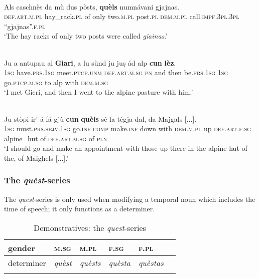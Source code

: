 \ea\label{demtop1}
\\
\gll   Als caschnès da mù dus pòsts, \textbf{quèls} numnávani gjajnas.\\
     \textsc{def.art.m.pl} hay\_rack.\textsc{pl} of only two.\textsc{m.pl} post.\textsc{pl} \textsc{dem.m.pl} call.\textsc{impf.3pl.3pl} “gjajnas”.\textsc{f.pl}\\
\glt `The hay racks of only two posts were called \textit{giainas}.'
\z

\ea
\label{demtop5}
\\
\gll Ju a antupau al \textbf{Giari}, a lu sùnd ju juṣ ád alp \textbf{cun} \textbf{lèz}.\\
\textsc{1sg} have.\textsc{prs.1sg} meet.\textsc{ptcp.unm} \textsc{def.art.m.sg} \textsc{pn} and then be.\textsc{prs.1sg} \textsc{1sg} go.\textsc{ptcp.m.sg} to alp with \textsc{dem.m.sg}  \\
\glt `I met Gieri, and then I went to the alpine pasture with him.'
\z

\ea\label{demtop3}
\\
\gll Ju stòpi ir' á fá gjù \textbf{cun} \textbf{quèls} sé la tégja dal, da Majgals [...].\\
\textsc{1sg} must.\textsc{prs.sbjv.1sg} go.\textsc{inf} \textsc{comp} make.\textsc{inf} down with \textsc{dem.m.pl} up \textsc{def.art.f.sg} alpine\_hut of.\textsc{def.art.m.sg} of \textsc{pln}\\
\glt `I should go and make an appointment with those up there in the alpine hut of the, of Maighels [...].'
\z

\subsubsection{The \textit{quèst}-series}
The \textit{quest}-series is only used when modifying a temporal noun which includes the time of speech; it only functions as a determiner.

\begin{table}
\caption{Demonstratives: the \textit{quest}-series}
\label{demquest}
 \begin{tabular}{llllll}
  \lsptoprule
      gender      & \textsc{m.sg} & \textsc{m.pl} & \textsc{f.sg} & \textsc{f.pl}\\
  \midrule
  determiner  & \textit{quèst} &  \textit{quèsts}  & \textit{quèsta}  & \textit{quèstas}\\
  
  \lspbottomrule
 \end{tabular}
\end{table}

